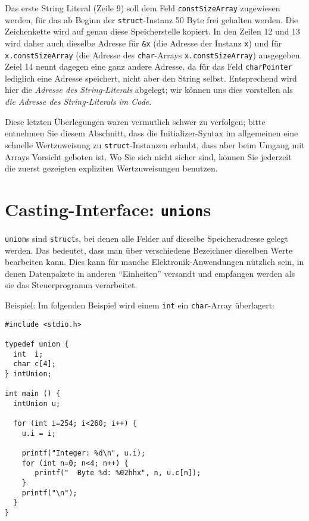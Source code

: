 Das erste String Literal (Zeile 9) soll dem Feld \texttt{constSizeArray} zugewiesen werden, für das ab Beginn der \texttt{struct}-Instanz 50 Byte frei gehalten werden. Die Zeichenkette wird auf genau diese Speicherstelle kopiert. In den Zeilen 12 und 13 wird daher auch dieselbe Adresse für \texttt{\&x} (die Adresse der Instanz \texttt{x}) und für \texttt{x.constSizeArray} (die Adresse des \texttt{char}-Arrays \texttt{x.constSizeArray}) ausgegeben. Zeiel 14 nennt dagegen eine ganz andere Adresse, da für das Feld \texttt{charPointer} lediglich eine Adresse speichert, nicht aber den String selbst. Entsprechend wird hier die \emph{Adresse des String-Literals} abgelegt; wir können uns dies vorstellen als \emph{die Adresse des String-Literals im Code}.

Diese letzten Überlegungen waren vermutlich schwer zu verfolgen; bitte entnehmen Sie diesem Abschnitt, dass die Initializer-Syntax im allgemeinen eine schnelle Wertzuweisung zu \texttt{struct}-Instanzen erlaubt, dass aber beim Umgang mit Arrays Vorsicht geboten ist. Wo Sie sich nicht sicher sind, können Sie jederzeit die zuerst gezeigten expliziten Wertzuweisungen benutzen.

\section{Casting-Interface: \texttt{union}s}
\texttt{union}s sind \texttt{struct}s, bei denen alle Felder auf dieselbe Speicheradresse gelegt werden. Das bedeutet, dass man über verschiedene Bezeichner dieselben Werte bearbeiten kann. Dies kann für manche Elektronik-Anwendungen nützlich sein, in denen Datenpakete in anderen \enquote{Einheiten} versandt und empfangen werden als sie das Steuerprogramm verarbeitet.

Beispiel: Im folgenden Beispiel wird einem \texttt{int} ein \texttt{char}-Array überlagert:

\begin{codebox}
\begin{verbatim}
#include <stdio.h>

typedef union {
  int  i;
  char c[4];
} intUnion;

int main () {
  intUnion u;
  
  for (int i=254; i<260; i++) {
    u.i = i;
    
    printf("Integer: %d\n", u.i);
    for (int n=0; n<4; n++) {
       printf("  Byte %d: %02hhx", n, u.c[n]);
    }
    printf("\n");
  }
}
\end{verbatim}
\end{codebox}

